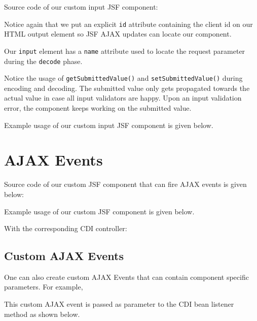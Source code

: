 Source code of our custom input JSF component:


Notice again that we put an explicit \texttt{id} attribute containing the client id on our HTML output element so JSF AJAX updates can locate our component.

Our \texttt{input} element has a \texttt{name} attribute used to locate the request parameter during the \texttt{decode} phase.

Notice the usage of \texttt{getSubmittedValue()} and \texttt{setSubmittedValue()} during encoding and decoding.
The submitted value only gets propagated towards the actual value in case all input validators are happy.
Upon an input validation error, the component keeps working on the submitted value.

Example usage of our custom input JSF component is given below.


\section{AJAX Events}

Source code of our custom JSF component that can fire AJAX events is given below:


Example usage of our custom JSF component is given below.


With the corresponding CDI controller:


\subsection{Custom AJAX Events}

One can also create custom AJAX Events that can contain component specific parameters.
For example,


This custom AJAX event is passed as parameter to the CDI bean listener method as shown below.


